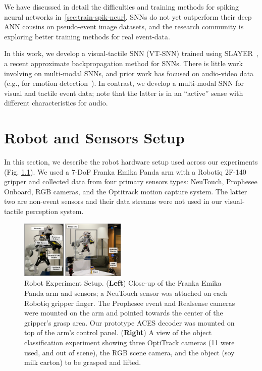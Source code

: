 \documentclass[fyp]{socreport}
\begin{document}
We have discussed in detail the difficulties and training methods for spiking
neural networks in~\autoref{sec:train-spik-neur}. SNNs do not yet outperform
their deep ANN cousins on pseudo-event image datasets, and the research
community is exploring better training methods for real event-data.

In this work, we develop a visual-tactile SNN (VT-SNN) trained using
SLAYER~\cite{NIPS2018_7415}, a recent approximate backpropagation method for
SNNs. There is little work involving on multi-modal SNNs, and prior work has
focused on audio-video data~\cite{chevallier2005distributed,Rathi2018} (e.g.,
for emotion detection~\cite{mansouri2019speech}). In contrast, we develop a
multi-modal SNN for visual and tactile event data; note that the latter is in an
``active'' sense with different characteristics for audio.

\chapter{Robot and Sensors Setup\label{cha:exp_setup}}

In this section, we describe the robot hardware setup used across our
experiments (Fig. \ref{fig:robotsetup}). We used a 7-DoF Franka Emika Panda arm
with a Robotiq 2F-140 gripper and collected data from four primary sensors
types: NeuTouch, Prophesee Onboard, RGB cameras, and the Optitrack motion
capture system. The latter two are non-event sensors and their data streams were
not used in our visual-tactile perception system.

\begin{figure}
  \centering
  \includegraphics[width=0.45\textwidth]{images/robotsetup/robot_setup_wsensors.pdf}
  \caption{Robot Experiment Setup. (\textbf{Left}) Close-up of the Franka Emika
    Panda arm and sensors; a NeuTouch sensor was attached on each Robotiq
    gripper finger. The Prophesee event and Realsense cameras were mounted on
    the arm and pointed towards the center of the gripper's grasp area. Our
    prototype ACES decoder was mounted on top of the arm's control panel.
    (\textbf{Right}) A view of the object classification experiment showing
    three OptiTrack cameras (11 were used, and out of scene), the RGB scene
    camera, and the object (soy milk carton) to be grasped and lifted.}
\label{fig:robotsetup}
\end{figure}
\end{document}

